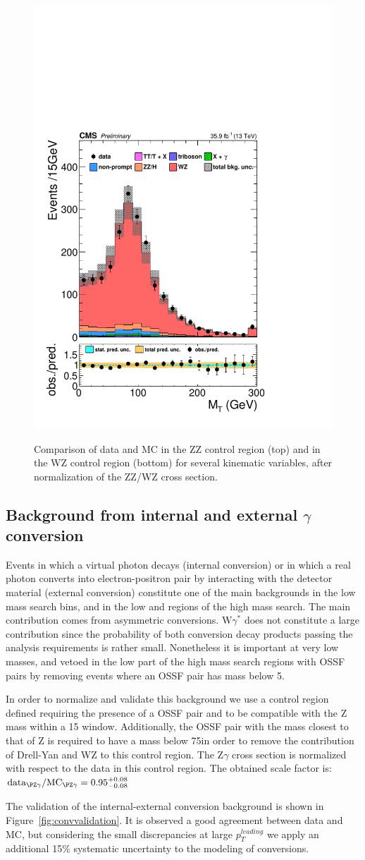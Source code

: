 \begin{figure}[h]
{\includegraphics[width=.27\textwidth]{Figures/c5/WZCR/PtandMetCuts/mt_minMos_WZ.pdf}}
\caption{Comparison of data and MC in the ZZ control region (top) and in the WZ control region (bottom) for several kinematic variables, after normalization of the ZZ/WZ cross section. \willem} 
\label{fig:validation}
\end{figure}

\subsection{Background from internal and external $\gamma$ conversion}\label{sec:conversion}
Events in which a virtual photon decays (internal conversion) or in
which a  real photon converts into electron-positron pair by interacting with the
detector material (external conversion) constitute one of the main backgrounds in the
 low mass search bins, and in the low \mmin  and \mlll
  regions of the high mass search. The main contribution comes from
  asymmetric conversions. W$\gamma^{*}$ does not constitute a large contribution since the
 probability of both conversion decay products passing the analysis
 \pt requirements is rather small. Nonetheless it is important at very low
 masses, and vetoed in the low \mlll  part of the high mass search
 regions with OSSF pairs by removing events where an OSSF pair has mass below 5\GeV.

In order to normalize and validate this background we use a control
region defined requiring the presence of a OSSF pair and \mlll to be compatible with the Z mass within a 15\GeV
window. Additionally, the OSSF pair with the mass closest to that of Z
is required to have a mass below 75\GeV in order to remove the
contribution of Drell-Yan and WZ to this control region. The Z$\gamma$
cross section is normalized with respect to the data in this control
region. The obtained scale factor is:
$\text{data}_{\PZ\gamma}/\text{MC}_{\PZ\gamma} = 0.95_{-0.08}^{+0.08}$

The validation of the internal-external conversion background is shown
in Figure~\ref{fig:convvalidation}. It is observed a good agreement
between data and MC, but considering the small discrepancies at large
$p^{leading}_{T}$ we apply an additional 15\% systematic uncertainty to the modeling of conversions.

